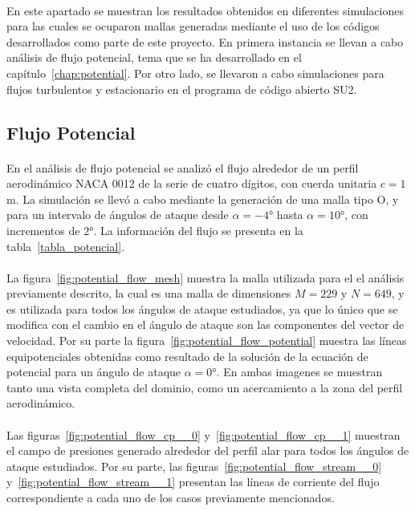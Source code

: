 \documentclass[letterpaper, openright, 12pt]{book}
\begin{document}
    \paragraph*{}
    En este apartado se muestran los resultados obtenidos en diferentes
    simulaciones para las cuales se ocuparon mallas generadas mediante el uso
    de los códigos desarrollados como parte de este proyecto. En primera
    instancia se llevan a cabo análisis de flujo potencial, tema que se ha
    desarrollado en el capítulo~\ref{chap:potential}. Por otro lado, se
    llevaron a cabo simulaciones para flujos turbulentos y estacionario en el
    programa de código abierto SU2.


    \subsection{Flujo Potencial}
    \paragraph*{}
    En el análisis de flujo potencial se analizó el flujo alrededor de un
    perfil aerodinámico NACA 0012 de la serie de cuatro dígitos, con cuerda
    unitaria $c = 1$ m. La simulación se llevó a cabo mediante la generación
    de una malla tipo O, y para un intervalo de ángulos de ataque desde
    $\alpha = -4\si{\degree}$ hasta $\alpha = 10\si{\degree}$, con incrementos
    de $2\si{\degree}$. La información del flujo se presenta en la
    tabla~\ref{tabla_potencial}.

    \paragraph*{}
    La figura~\ref{fig:potential_flow_mesh} muestra la malla utilizada para el
    el análisis previamente descrito, la cual es una malla de
    dimensiones $M = 229$ y $N = 649$, y es utilizada para todos los ángulos de
    ataque estudiados, ya que lo único que se modifica con el cambio en el
    ángulo de ataque son las componentes del vector de velocidad. Por su parte
    la figura~\ref{fig:potential_flow_potential} muestra las líneas
    equipotenciales obtenidas como resultado de la solución de la ecuación de
    potencial para un ángulo de ataque $\alpha = 0\si{\degree}$. En ambas
    imagenes se muestran tanto una vista completa del dominio, como un
    acercamiento a la zona del perfil aerodinámico.

    \paragraph*{}
    Las figuras~\ref{fig:potential_flow_cp__0} y~\ref{fig:potential_flow_cp__1}
    muestran el campo de presiones generado alrededor del perfil alar para
    todos los ángulos de ataque estudiados. Por su parte, las
    figuras~\ref{fig:potential_flow_stream__0}
    y~\ref{fig:potential_flow_stream__1} presentan las líneas de corriente del
    flujo correspondiente a cada uno de los casos previamente mencionados.
\end{document}
